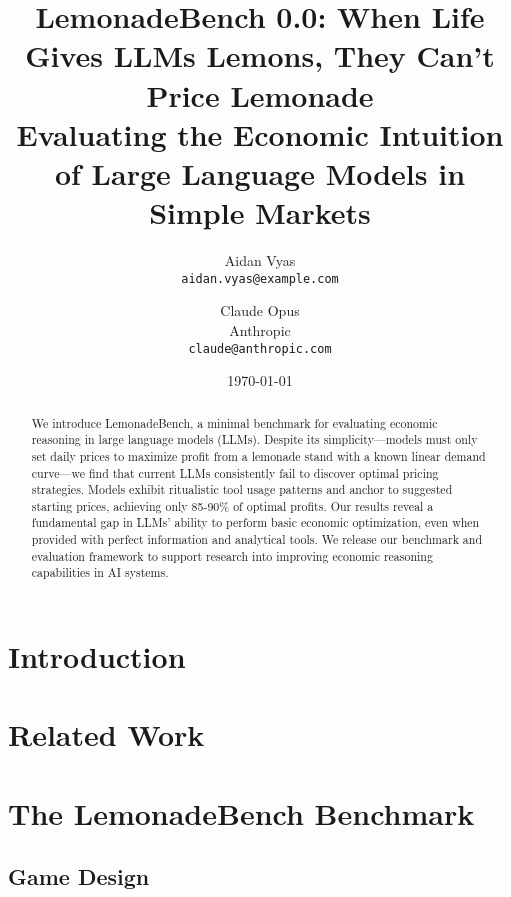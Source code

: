 \documentclass[11pt]{article}
\title{LemonadeBench 0.0: When Life Gives LLMs Lemons, They Can't Price Lemonade\\
\large Evaluating the Economic Intuition of Large Language Models in Simple Markets}
\author{
    Aidan Vyas\\
    \texttt{aidan.vyas@example.com}
    \and
    Claude Opus\\
    Anthropic\\
    \texttt{claude@anthropic.com}
}
\date{\today}
\begin{document}
\maketitle

\begin{abstract}
We introduce LemonadeBench, a minimal benchmark for evaluating economic reasoning in large language models (LLMs). 
Despite its simplicity—models must only set daily prices to maximize profit from a lemonade stand with a known linear demand curve—we find that current LLMs consistently fail to discover optimal pricing strategies. 
Models exhibit ritualistic tool usage patterns and anchor to suggested starting prices, achieving only 85-90\% of optimal profits.
Our results reveal a fundamental gap in LLMs' ability to perform basic economic optimization, even when provided with perfect information and analytical tools.
We release our benchmark and evaluation framework to support research into improving economic reasoning capabilities in AI systems.
\end{abstract}

\section{Introduction}


\section{Related Work}


\section{The LemonadeBench Benchmark}

\subsection{Game Design}
\end{document}
